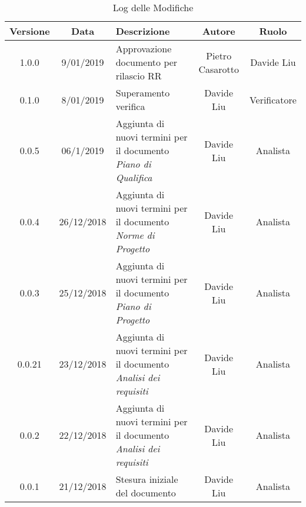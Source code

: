
\begin{table}[!htbp] %
            \centering
            \renewcommand{\arraystretch}{2}
            \begin{tabular}{|c|c|p{5cm}|c|c|} %
                \rowcolor{orange!50} %
        		\hline
        		\textbf{Versione} & \textbf{Data} & \textbf{Descrizione} & \textbf{Autore} & \textbf{Ruolo} \\
                \hline
                1.0.0 & 9/01/2019 & Approvazione documento per rilascio RR & Pietro Casarotto & Davide Liu \\
                \hline
                0.1.0 & 8/01/2019 & Superamento verifica & Davide Liu & Verificatore \\
                \hline
                0.0.5 & 06/1/2019 & Aggiunta di nuovi termini per il documento \textit{Piano di Qualifica} & Davide Liu & Analista \\
                \hline
                0.0.4 & 26/12/2018 & Aggiunta di nuovi termini per il documento \textit{Norme di Progetto} & Davide Liu & Analista \\
                \hline
                0.0.3 & 25/12/2018 & Aggiunta di nuovi termini per il documento \textit{Piano di Progetto} & Davide Liu & Analista \\
                \hline
                0.0.21 & 23/12/2018 & Aggiunta di nuovi termini per il documento \textit{Analisi dei requisiti} & Davide Liu & Analista \\
                \hline
                0.0.2 & 22/12/2018 & Aggiunta di nuovi termini per il documento \textit{Analisi dei requisiti} & Davide Liu & Analista \\
                \hline
                0.0.1 & 21/12/2018 & Stesura iniziale del documento & Davide Liu & Analista \\
                \hline
                
        \end{tabular}
        \caption{Log delle Modifiche} %
\end{table}